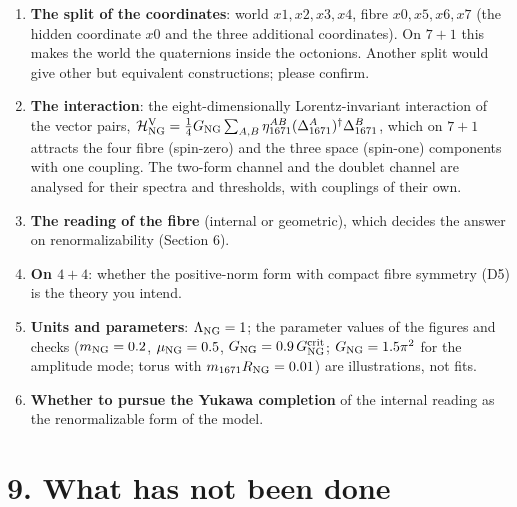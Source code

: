 \documentclass[
  10pt,
]{article}
\providecommand{\tightlist}{%
  \setlength{\itemsep}{0pt}\setlength{\parskip}{0pt}}
\begin{document}
\begin{enumerate}
\def\labelenumi{\arabic{enumi}.}
\tightlist
\item
  \textbf{The split of the coordinates}: world \(x1,x2,x3,x4\), fibre
  \(x0,x5,x6,x7\) (the hidden coordinate \(x0\) and the three additional
  coordinates). On \(7+1\) this makes the world the quaternions inside
  the octonions. Another split would give other but equivalent
  constructions; please confirm.
\item
  \textbf{The interaction}: the eight-dimensionally Lorentz-invariant
  interaction of the vector pairs,
  \(\mathcal H^{\rm V}_{\rm NG}=\tfrac14G_{\rm NG}\sum_{A,B}\eta^{AB}_{1671}(\Delta^A_{1671})^\dagger\Delta^B_{1671}\),
  which on \(7+1\) attracts the four fibre (spin-zero) and the three
  space (spin-one) components with one coupling. The two-form channel
  and the doublet channel are analysed for their spectra and thresholds,
  with couplings of their own.
\item
  \textbf{The reading of the fibre} (internal or geometric), which
  decides the answer on renormalizability (Section 6).
\item
  \textbf{On \(4+4\)}: whether the positive-norm form with compact fibre
  symmetry (D5) is the theory you intend.
\item
  \textbf{Units and parameters}: \(\Lambda_{\rm NG}=1\); the parameter
  values of the figures and checks (\(m_{\rm NG}=0.2\),
  \(\mu_{\rm NG}=0.5\), \(G_{\rm NG}=0.9\,G^{\rm crit}_{\rm NG}\);
  \(G_{\rm NG}=1.5\pi^2\) for the amplitude mode; torus with
  \(m_{1671}R_{\rm NG}=0.01\)) are illustrations, not fits.
\item
  \textbf{Whether to pursue the Yukawa completion} of the internal
  reading as the renormalizable form of the model.
\end{enumerate}

\hypertarget{what-has-not-been-done}{%
\section{9. What has not been done}\label{what-has-not-been-done}}
\end{document}
